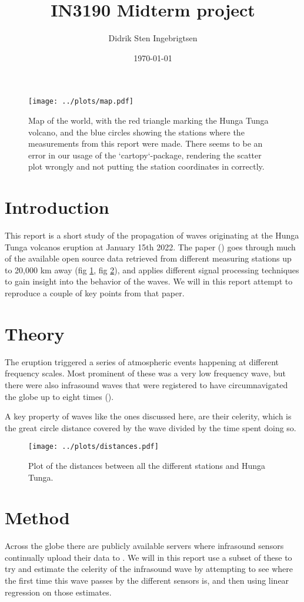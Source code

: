\documentclass[11pt, a4paper]{article}
\title{IN3190 Midterm project}
\author{Didrik Sten Ingebrigtsen}
\date{\today}
\begin{document}
\maketitle

\begin{figure}
\texttt{[image: ../plots/map.pdf]}
\caption{Map of the world, with the red triangle marking the Hunga Tunga volcano, and the blue circles showing the stations where the measurements from this report were made. There seems to be an error in our usage of the `cartopy`-package, rendering the scatter plot wrongly and not putting the station coordinates in correctly.}
\label{fig:map}
\end{figure}

\section{Introduction}
This report is a short study of the propagation of waves originating at the Hunga Tunga volcanos eruption at January 15th 2022. The paper (\cite{nhess}) goes through much of the available open source data retrieved from different measuring stations up to 20,000 km away (fig \ref{fig:map}, fig \ref{fig:distances}), and applies different signal processing techniques to gain insight into the behavior of the waves. We will in this report attempt to reproduce a couple of key points from that paper.

\section{Theory}
The eruption triggered a series of atmospheric events happening at different frequency scales. Most prominent of these was a very low frequency wave, but there were also infrasound waves that were registered to have circumnavigated the globe up to eight times (\cite{vergoz}).

A key property of waves like the ones discussed here, are their celerity, which is the great circle distance covered by the wave divided by the time spent doing so.

\begin{figure}
\texttt{[image: ../plots/distances.pdf]}
\caption{Plot of the distances between all the different stations and Hunga Tunga.}
\label{fig:distances}
\end{figure}

\section{Method}
Across the globe there are publicly available servers where infrasound sensors continually upload their data to \cite{nhess}. We will in this report use a subset of these to try and estimate the celerity of the infrasound wave by attempting to see where the first time this wave passes by the different sensors is, and then using linear regression on those estimates.
\end{document}
